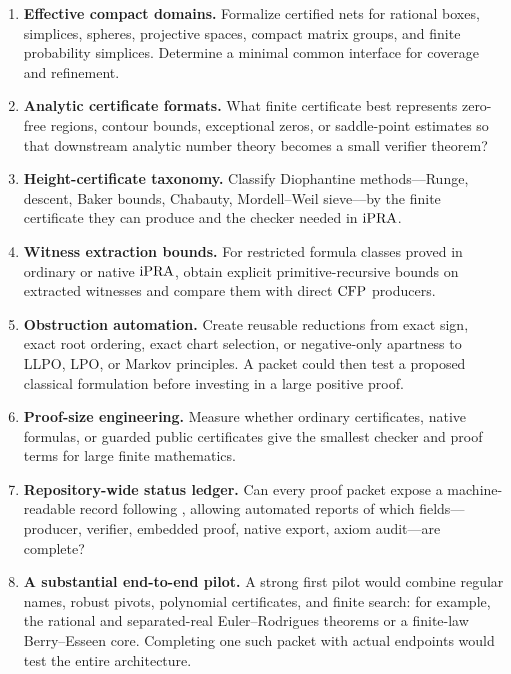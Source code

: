 \begin{enumerate}
\item \textbf{Effective compact domains.}
Formalize certified nets for rational boxes, simplices, spheres, projective
spaces, compact matrix groups, and finite probability simplices.  Determine a
minimal common interface for coverage and refinement.

\item \textbf{Analytic certificate formats.}
What finite certificate best represents zero-free regions, contour bounds,
exceptional zeros, or saddle-point estimates so that downstream analytic
number theory becomes a small verifier theorem?

\item \textbf{Height-certificate taxonomy.}
Classify Diophantine methods---Runge, descent, Baker bounds, Chabauty,
Mordell--Weil sieve---by the finite certificate they can produce and the
checker needed in \(\mathrm{iPRA}\).

\item \textbf{Witness extraction bounds.}
For restricted formula classes proved in ordinary or native \(\mathrm{iPRA}\), obtain
explicit primitive-recursive bounds on extracted witnesses and compare them
with direct \(\mathrm{CFP}\) producers.

\item \textbf{Obstruction automation.}
Create reusable reductions from exact sign, exact root ordering, exact chart
selection, or negative-only apartness to LLPO, LPO, or Markov principles.  A
packet could then test a proposed classical formulation before investing in a
large positive proof.

\item \textbf{Proof-size engineering.}
Measure whether ordinary  certificates, native formulas, or guarded
public certificates give the smallest checker and proof terms for large
finite mathematics.

\item \textbf{Repository-wide status ledger.}
Can every proof packet expose a machine-readable record following
, allowing automated reports of which
fields---producer, verifier, embedded proof, native export, axiom audit---are
complete?

\item \textbf{A substantial end-to-end pilot.}
A strong first pilot would combine regular names, robust pivots, polynomial
certificates, and finite search: for example, the rational and separated-real
Euler--Rodrigues theorems or a finite-law Berry--Esseen core.  Completing one
such packet with actual  endpoints would test the entire
architecture.
\end{enumerate}
